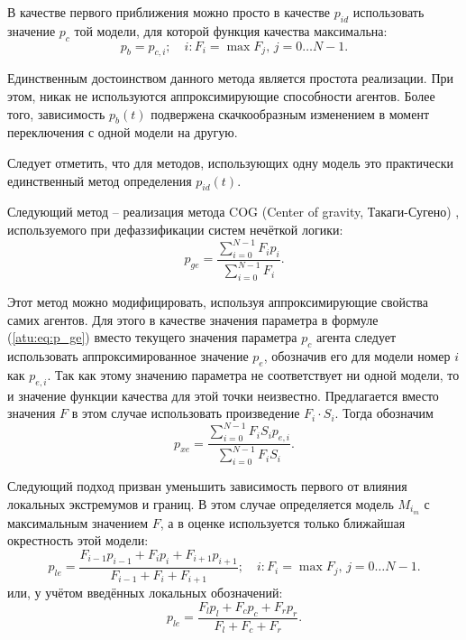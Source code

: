 В качестве первого приближения можно просто в качестве $p_{id}$
использовать значение $p_c$ той модели, для которой функция качества максимальна:
%
\begin{equation}
  p_{b}
  =
  p_{c,i};
  \quad
  i : F_i = \max{F_j}, \, j=0 \ldots N-1 .
  \label{atu:eq:p_b}
\end{equation}

Единственным достоинством данного метода является простота реализации.
При этом, никак не используются аппроксимирующие способности агентов.
Более того, зависимость $p_{b}(t)$ подвержена
скачкообразным изменением в момент переключения
с одной модели на другую.

Следует отметить, что для методов, использующих
одну модель это практически единственный метод определения $p_{id}(t)$.


Следующий метод -- реализация
метода COG (Center of gravity, Такаги-Сугено) \cite{atu_asau25,atu_csit2015},
используемого при дефаззификации систем нечёткой логики:
%
\begin{equation}
  p_{ge}
  =
  \frac{\sum\limits_{i=0}^{N-1} F_{i} p_{i}}
       {\sum\limits_{i=0}^{N-1} F_{i} }
  .
  \label{atu:eq:p_ge}
\end{equation}

Этот метод можно модифицировать, используя аппроксимирующие свойства самих агентов.
Для этого в качестве значения параметра в формуле (\ref{atu:eq:p_ge})
вместо текущего значения параметра $p_c$ агента следует использовать
аппроксимированное значение $p_e$, обозначив его для
модели номер $i$ как $p_{e,i}$. Так как этому значению
параметра не соответствует ни одной модели, то и значение функции
качества для этой точки неизвестно. Предлагается вместо
значения $F$ в этом случае использовать произведение
$F_i \cdot S_i$. Тогда обозначим
%
\begin{equation}
  p_{xe}
  =
  \frac{\sum\limits_{i=0}^{N-1} F_{i} S_i p_{e,i}}
       {\sum\limits_{i=0}^{N-1} F_{i} S_i }
  .
  \label{atu:eq:p_xe}
\end{equation}

Следующий подход призван уменьшить зависимость первого
от влияния локальных экстремумов и границ. В этом
случае определяется модель $M_{i_{m}}$ с максимальным значением
$F$, а в оценке используется только ближайшая окрестность этой модели:
%
\begin{equation}
  p_{le}
  =
  \frac{ F_{i-1} p_{i-1} + F_{i} p_{i} + F_{i+1} p_{i+1} }
       { F_{i-1}         + F_{i}       + F_{i+1}         }
  ;
  \quad
  i : F_i = \max{F_j}, \, j=0 \ldots N-1 .
  \label{atu:eq:p_le}
\end{equation}
%
или, у учётом введённых локальных обозначений:
%
\begin{equation}
  p_{le}
  =
  \frac{ F_{l} p_{l} + F_{c} p_{c} + F_{r} p_{r} }
       { F_{l}       + F_{c}       + F_{r}       }
  .
  \label{atu:eq:p_lel}
\end{equation}

